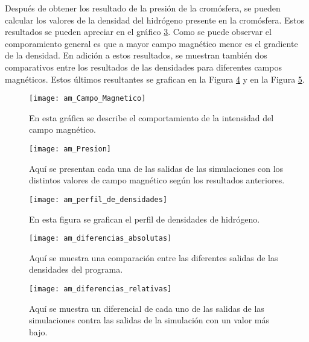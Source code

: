 Despu\'es de obtener los resultado de la presi\'on de la crom\'osfera, se pueden calcular los valores de la densidad del hidr\'ogeno presente en la crom\'osfera. Estos resultados se pueden apreciar en el gr\'afico \ref{am_perfil_de_densidades}. Como se puede observar el comporamiento general es que a mayor campo magn\'etico menor es el gradiente de la densidad. En adici\'on a estos resultados, se muestran tambi\'en dos comparativos entre los resultados de las densidades para diferentes campos magn\'eticos. Estos \'ultimos resultantes se grafican en la Figura \ref{am_diferencias_absolutas} y en la Figura \ref{am_diferencias_relativas}.

\newpage
\begin{figure}[h]
\centering
\texttt{[image: am\_Campo\_Magnetico]}
\caption{ En esta gr\'afica se describe el comportamiento de la intensidad del campo magn\'etico. }
\label{am_Campo_Magnetico}
\end{figure}


\begin{figure}[h]
\centering
\texttt{[image: am\_Presion]}
\caption{ Aqu\'i se presentan cada una de las salidas de las simulaciones con los distintos valores de campo magn\'etico seg\'un los resultados anteriores.}
\label{am_Presion}
\end{figure}

\begin{figure}[h]
\centering
\texttt{[image: am\_perfil\_de\_densidades]}
\caption{ En esta figura se grafican el perfil de densidades de hidr\'ogeno.}
\label{am_perfil_de_densidades}
\end{figure}

\begin{figure}[h]
\centering
\texttt{[image: am\_diferencias\_absolutas]}
\caption{ Aqu\'i se muestra una comparaci\'on entre las diferentes salidas de las densidades del programa.}
\label{am_diferencias_absolutas}
\end{figure}

\begin{figure}[h]
\centering
\texttt{[image: am\_diferencias\_relativas]}
\caption{ Aqu\'i se muestra un diferencial de cada uno de las salidas de las simulaciones contra las salidas de la simulaci\'on con un valor m\'as bajo.}
\label{am_diferencias_relativas}
\end{figure}
